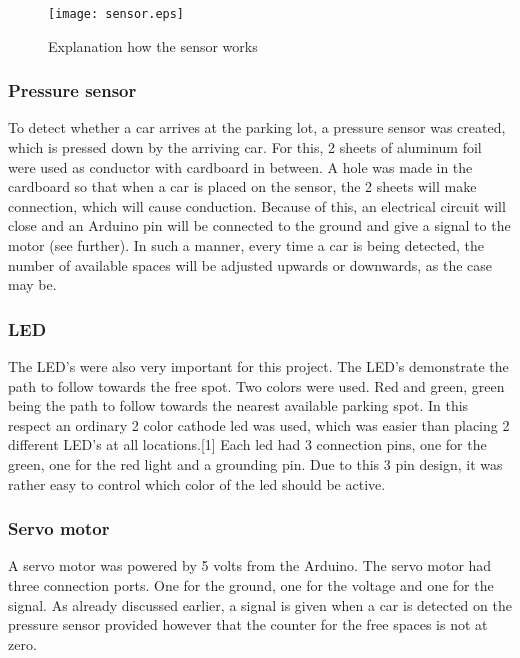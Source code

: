 \documentclass[10pt,twocolumn]{article}
\begin{document}
\begin{figure}[H]
\begin{center}

   \texttt{[image: sensor.eps]}
\end{center}
   \caption{Explanation how the sensor works}
\label{fig:long}
\label{fig:onecol}
\end{figure}



\subsubsection{Pressure sensor}
To detect whether a car arrives at the parking lot, a pressure sensor was created, which is pressed down by the arriving car. For this, 2 sheets of aluminum foil were used as conductor with cardboard in between. A hole was made in the cardboard so that when a car is placed on the sensor, the 2 sheets will make connection, which will cause conduction. Because of this, an electrical circuit will close and an Arduino pin will be connected to the ground and give a signal to the motor (see further). In such a manner, every time a car is being detected, the number of available spaces will be adjusted upwards or downwards, as the case may be. 

\subsubsection{LED}
The LED’s were also very important for this project. The LED’s demonstrate the path to follow towards the free spot. Two colors were used. Red and green, green being the path to follow towards the nearest available parking spot. In this respect an ordinary 2 color cathode led was used, which was easier than placing 2 different LED’s at all locations.[1] Each led had 3 connection pins, one for the green, one for the red light and a grounding pin. Due to this 3 pin design, it was rather easy to control which color of the led should be active.


\subsubsection{Servo motor}
A servo motor was powered by 5 volts from the Arduino. The servo motor had three connection ports. One for the ground, one for the voltage and one for the signal.  As already discussed earlier, a signal is given when a car is detected on the pressure sensor provided however that the counter for the free spaces is not at zero.
\end{document}
